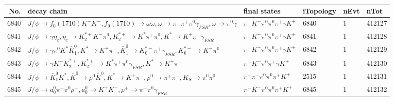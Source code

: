 \begin{table}[htbp] 
\begin{center}
\begin{small}
\begin{tabular}{rlllll}\hline\hline
 No. & decay chain & final states &  iTopology & nEvt & nTot \\\hline
6840&$J/\psi       \rightarrow f_{0}(1710)    K^{-}          K^{+}          , f_{0}(1710)     \rightarrow \omega         \omega         , \omega          \rightarrow \pi^{-}        \pi^{+}        \pi^{0}        \gamma_{FSR} , \omega          \rightarrow \pi^{0}        \gamma       $&$\pi^{-}        K^{-}          \pi^{0}        \pi^{0}        \pi^{+}        \gamma       K^{+}          $& 6840&    1&412127\\
6841&$J/\psi       \rightarrow \gamma       \eta_{c}    , \eta_{c}     \rightarrow K_2^{*+}       K^{-}          \pi^{0}        , K_2^{*+}        \rightarrow K^{*}          \pi^{+}        \pi^{0}        , K^{*}           \rightarrow K^{+}          \pi^{-}        \gamma_{FSR} $&$\pi^{-}        K^{-}          \pi^{0}        \pi^{0}        \pi^{+}        \gamma       K^{+}          $& 6841&    1&412128\\
6842&$J/\psi       \rightarrow \gamma       \pi^{0}        K^{*}          \bar{K}_1^{0} , K^{*}           \rightarrow K^{+}          \pi^{-}        , \bar{K}_1^{0}  \rightarrow K_{0}^{*-}     \pi^{+}        \gamma_{FSR} , K_{0}^{*-}      \rightarrow K^{-}          \pi^{0}        $&$\pi^{-}        K^{-}          \pi^{0}        \pi^{0}        \pi^{+}        \gamma       K^{+}          $& 6842&    1&412129\\
6843&$J/\psi       \rightarrow \gamma       K^{-}          K_2^{*+}       , K_2^{*+}        \rightarrow K^{*}          \pi^{+}        \pi^{0}        \gamma_{FSR} , K^{*}           \rightarrow K^{+}          \pi^{-}        $&$\pi^{-}        K^{-}          \pi^{0}        \pi^{+}        \gamma       K^{+}          $& 6843&    1&412130\\
6844&$J/\psi       \rightarrow \bar{K}_1^{0} K^{*}          , \bar{K}_1^{0}  \rightarrow \rho^{0}      \bar{K}^{0}   , K^{*}           \rightarrow K^{+}          \pi^{-}        , \rho^{0}       \rightarrow \pi^{+}        \pi^{-}        , K_{S}           \rightarrow \pi^{0}        \pi^{0}        $&$\pi^{-}        \pi^{-}        \pi^{0}        \pi^{0}        \pi^{+}        K^{+}          $& 2515&    1&412131\\
6845&$J/\psi       \rightarrow a_{0}^{0}      \pi^{-}        \pi^{0}        \rho^{+}      , a_{0}^{0}       \rightarrow K^{+}          K^{-}          , \rho^{+}       \rightarrow \pi^{+}        \pi^{0}        \gamma_{FSR} $&$\pi^{-}        K^{-}          \pi^{0}        \pi^{0}        \pi^{+}        K^{+}          $& 6845&    1&412132\\

\end{tabular}
\end{small}
\end{center}
\end{table}
